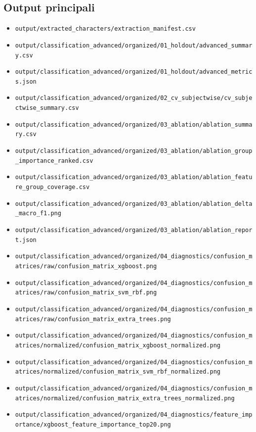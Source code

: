 \documentclass[a4paper,12pt]{article}
\begin{document}
\subsection{Output principali}
\begin{itemize}[leftmargin=1.5em]
  \item \texttt{output/extracted\_characters/extraction\_manifest.csv}
  \item \texttt{output/classification\_advanced/organized/01\_holdout/advanced\_summary.csv}
  \item \texttt{output/classification\_advanced/organized/01\_holdout/advanced\_metrics.json}
  \item \texttt{output/classification\_advanced/organized/02\_cv\_subjectwise/cv\_subjectwise\_summary.csv}
  \item \texttt{output/classification\_advanced/organized/03\_ablation/ablation\_summary.csv}
  \item \texttt{output/classification\_advanced/organized/03\_ablation/ablation\_group\_importance\_ranked.csv}
  \item \texttt{output/classification\_advanced/organized/03\_ablation/ablation\_feature\_group\_coverage.csv}
  \item \texttt{output/classification\_advanced/organized/03\_ablation/ablation\_delta\_macro\_f1.png}
  \item \texttt{output/classification\_advanced/organized/03\_ablation/ablation\_report.json}
  \item \texttt{output/classification\_advanced/organized/04\_diagnostics/confusion\_matrices/raw/confusion\_matrix\_xgboost.png}
  \item \texttt{output/classification\_advanced/organized/04\_diagnostics/confusion\_matrices/raw/confusion\_matrix\_svm\_rbf.png}
  \item \texttt{output/classification\_advanced/organized/04\_diagnostics/confusion\_matrices/raw/confusion\_matrix\_extra\_trees.png}
  \item \texttt{output/classification\_advanced/organized/04\_diagnostics/confusion\_matrices/normalized/confusion\_matrix\_xgboost\_normalized.png}
  \item \texttt{output/classification\_advanced/organized/04\_diagnostics/confusion\_matrices/normalized/confusion\_matrix\_svm\_rbf\_normalized.png}
  \item \texttt{output/classification\_advanced/organized/04\_diagnostics/confusion\_matrices/normalized/confusion\_matrix\_extra\_trees\_normalized.png}
  \item \texttt{output/classification\_advanced/organized/04\_diagnostics/feature\_importance/xgboost\_feature\_importance\_top20.png}
\end{itemize}
\end{document}
